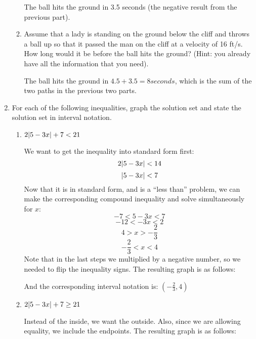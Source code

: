 \documentclass[letterpaper,12pt,fleqn]{article}
\begin{document}
\begin{enumerate}
\begin{enumerate}
    \bigskip

    The ball hits the ground in 3.5 seconds (the negative result from the
    previous part).

  \item Assume that a lady is standing on the ground below the cliff and throws
    a ball up so that it passed the man on the cliff at a velocity of 16 ft/s.
    How long would it be before the ball hits the ground? (Hint: you already
    have all the information that you need).

    \bigskip

    The ball hits the ground in $4.5+3.5=8 seconds$, which is the sum of the
    two paths in the previous two parts.
\end{enumerate}

  \bigskip

\item For each of the following inequalities, graph the solution set and
  state the solution set in interval notation.
  \begin{enumerate}
  \item $2\lvert5-3x\rvert+7<21$

    We want to get the inequality into standard form first:
    \[2\lvert5-3x\rvert<14\]
    \[\lvert5-3x\rvert<7\]
    Now that it is in standard form, and is a ``less than'' problem, we can
    make the corresponding compound inequality and solve simultaneously for
    $x$:
    \[-7<5-3x<7\]
    \[-12<-3x<2\]
    \[4>x>-\frac{2}{3}\]
    \[-\frac{2}{3}<x<4\]
    Note that in the last steps we multiplied by a negative number, so we
    needed to flip the inequality signs. The resulting graph is as follows:

    \bigskip


    \bigskip

    And the corresponding interval notation is: $\left(-\frac{2}{3},4\right)$
    
  \item $2\lvert5-3x\rvert+7\ge21$

    Instead of the inside, we want the outside. Also, since we are allowing
    equality, we include the endpoints.  The resulting graph is as follows:


\end{enumerate}
\end{enumerate}
\end{document}
